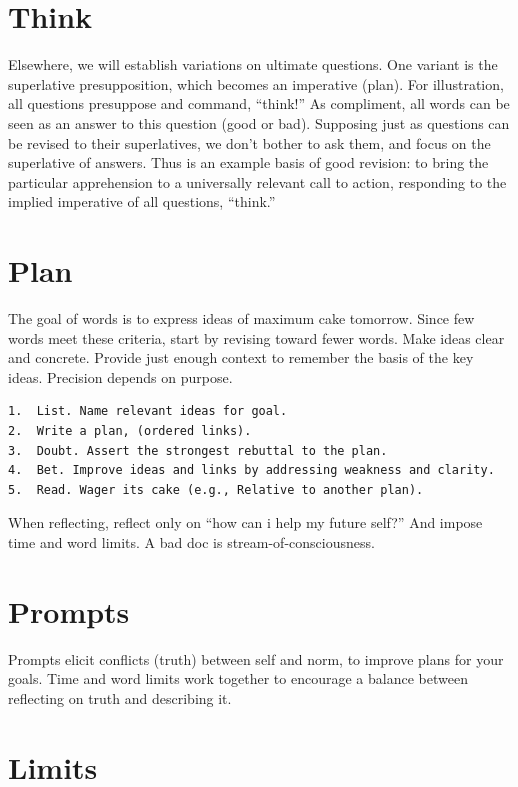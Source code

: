 \documentclass[
]{book}
\begin{document}
\section{Think}\label{think-1}

Elsewhere, we will establish variations on ultimate questions.
One variant is the superlative presupposition, which becomes an imperative (plan).
For illustration, all questions presuppose and command, ``think!''
As compliment, all words can be seen as an answer to this question (good or bad).
Supposing just as questions can be revised to their superlatives, we don't bother to ask them, and focus on the superlative of answers.
Thus is an example basis of good revision: to bring the particular apprehension to a universally relevant call to action, responding to the implied imperative of all questions, ``think.''

\section{Plan}\label{change-plan2}

The goal of words is to express ideas of maximum cake tomorrow.
Since few words meet these criteria, start by revising toward fewer words.
Make ideas clear and concrete.
Provide just enough context to remember the basis of the key ideas.
Precision depends on purpose.

\begin{verbatim}
1.  List. Name relevant ideas for goal.
2.  Write a plan, (ordered links).
3.  Doubt. Assert the strongest rebuttal to the plan.
4.  Bet. Improve ideas and links by addressing weakness and clarity.
5.  Read. Wager its cake (e.g., Relative to another plan).
\end{verbatim}

When reflecting, reflect only on ``how can i help my future self?'' And impose time and word limits.
A bad doc is stream-of-consciousness.

\section{Prompts}\label{prompts}

Prompts elicit conflicts (truth) between self and norm, to improve plans for your goals.
Time and word limits work together to encourage a balance between reflecting on truth and describing it.

\section{Limits}\label{limits}
\end{document}
